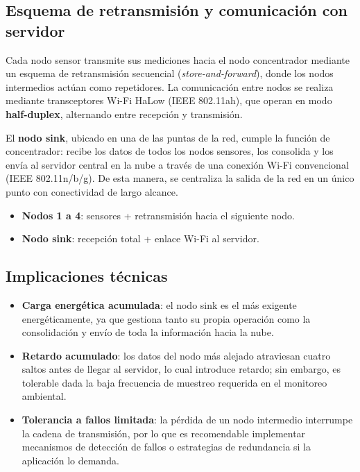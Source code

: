 \subsection*{Esquema de retransmisión y comunicación con servidor}

Cada nodo sensor transmite sus mediciones hacia el nodo concentrador mediante un esquema de retransmisión secuencial (\textit{store-and-forward}), donde los nodos intermedios actúan como repetidores. La comunicación entre nodos se realiza mediante transceptores Wi-Fi HaLow (IEEE 802.11ah), que operan en modo \textbf{half-duplex}, alternando entre recepción y transmisión.

El \textbf{nodo sink}, ubicado en una de las puntas de la red, cumple la función de concentrador: recibe los datos de todos los nodos sensores, los consolida y los envía al servidor central en la nube a través de una conexión Wi-Fi convencional (IEEE 802.11n/b/g). De esta manera, se centraliza la salida de la red en un único punto con conectividad de largo alcance.

\begin{itemize}
    \item \textbf{Nodos 1 a 4}: sensores + retransmisión hacia el siguiente nodo.
    \item \textbf{Nodo sink}: recepción total + enlace Wi-Fi al servidor.
\end{itemize}

\subsection*{Implicaciones técnicas}

\begin{itemize}
    \item \textbf{Carga energética acumulada}: el nodo sink es el más exigente energéticamente, ya que gestiona tanto su propia operación como la consolidación y envío de toda la información hacia la nube.
    \item \textbf{Retardo acumulado}: los datos del nodo más alejado atraviesan cuatro saltos antes de llegar al servidor, lo cual introduce retardo; sin embargo, es tolerable dada la baja frecuencia de muestreo requerida en el monitoreo ambiental.
    \item \textbf{Tolerancia a fallos limitada}: la pérdida de un nodo intermedio interrumpe la cadena de transmisión, por lo que es recomendable implementar mecanismos de detección de fallos o estrategias de redundancia si la aplicación lo demanda.
\end{itemize}

